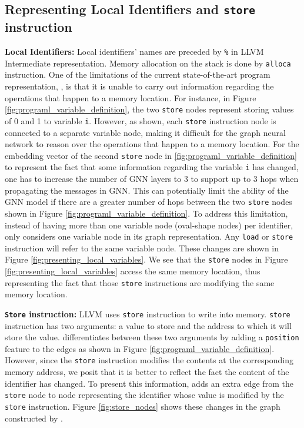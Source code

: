 \subsection{Representing Local Identifiers and \texttt{store} instruction}
\textbf{Local Identifiers:} Local identifiers' names are preceded by \texttt{\%} in LLVM Intermediate representation.
Memory allocation on the stack is done by \texttt{alloca} instruction.
One of the limitations of the current state-of-the-art program representation, \programl, is that it is unable to carry out information regarding the operations that happen to a memory location.
For instance, in Figure \ref{fig:programl_variable_definition}, the two \texttt{store} nodes represent storing values of 0 and 1 to variable \texttt{i}. However, as shown, each \texttt{store} instruction node is connected to a separate variable node, making it difficult for the graph neural network to reason over the operations that happen to a memory location. For the embedding vector of the second \texttt{store} node in \ref{fig:programl_variable_definition} to represent the fact that some information regarding the variable \texttt{i} has changed, one has to increase the number of GNN layers to 3 to support up to 3 hops when propagating the messages in GNN. This can potentially limit the ability of the GNN model if there are a greater number of hops between the two \texttt{store} nodes shown in Figure \ref{fig:programl_variable_definition}.
To address this limitation, instead of having more than one variable node (oval-shape nodes) per identifier, \ourtool only considers one variable node in its graph representation. Any \texttt{load} or \texttt{store} instruction will refer to the same variable node. These changes are shown in Figure \ref{fig:presenting_local_variables}. We see that the \texttt{store} nodes in Figure \ref{fig:presenting_local_variables} access the same memory location, thus representing the fact that those \texttt{store} instructions are modifying the same memory location.

\textbf{\texttt{Store} instruction:} 
LLVM uses \texttt{store} instruction to write into memory. \texttt{store} instruction has two arguments: a value to store and the address to which it will store the value.
\programl differentiates between these two arguments by adding a \texttt{position} feature to the edges as shown in Figure \ref{fig:programl_variable_definition}.
However, since the \texttt{store} instruction modifies the contents at the corresponding memory address, we posit that it is better to reflect the fact the content of the identifier has changed. 
To present this information, \ourtool adds an extra edge from the \texttt{store} node to node representing the identifier whose value is modified by the \texttt{store} instruction. 
Figure \ref{fig:store_nodes} shows these changes in the graph constructed by \ourtool.

